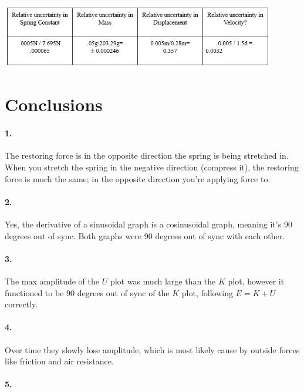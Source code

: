     \begin{center}
        \includegraphics[width=0.9\textwidth]{images51.png}
    \end{center}

    \section*{Conclusions}

    \paragraph*{1.}

    The restoring force is in the opposite direction the spring is being stretched in. When you stretch the spring in the negative direction (compress it), the restoring force is much the same; in the opposite direction you're applying force to.

    \paragraph*{2.}

    Yes, the derivative of a sinusoidal graph is a cosinusoidal graph, meaning it's 90 degrees out of sync. Both graphs were 90 degrees out of sync with each other.

    \paragraph*{3.}

    The max amplitude of the $U$ plot was much large than the $K$ plot, however it functioned to be 90 degrees out of sync of the $K$ plot, following $E = K + U$ correctly.

    \paragraph*{4.}

    Over time they slowly lose amplitude, which is most likely cause by outside forces like friction and air resistance.

    \paragraph*{5.}

